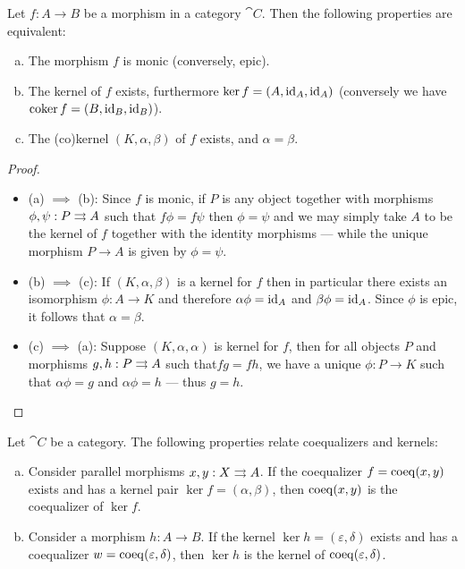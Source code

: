 \begin{proposition}
\label{prop:(co)kernel-properties}
Let \(f: A \to B\) be a morphism in a category \(\cat C\). Then the following
properties are equivalent:
\begin{enumerate}[(a)]\setlength\itemsep{0em}
\item The morphism \(f\) is monic (conversely, epic).
\item The kernel of \(f\) exists, furthermore \(\ker f = (A, \operatorname{id}_A, \operatorname{id}_A)\)
  (conversely we have \(\operatorname{coker} f = (B, \operatorname{id}_B, \operatorname{id}_B)\)).
\item The (co)kernel \((K, \alpha, \beta)\) of \(f\) exists, and
  \(\alpha = \beta\).
\end{enumerate}
\end{proposition}

\begin{proof}
\begin{itemize}\setlength\itemsep{0em}
\item (a) \(\implies\) (b): Since \(f\) is monic, if \(P\) is any object
  together with morphisms \(\phi, \psi: P \rightrightarrows A\) such that
  \(f \phi = f \psi\) then \(\phi = \psi\) and we may simply take \(A\) to be
  the kernel of \(f\) together with the identity morphisms --- while the unique
  morphism \(P \to A\) is given by \(\phi = \psi\).

\item (b) \(\implies\) (c): If \((K, \alpha, \beta)\) is a kernel for \(f\) then
  in particular there exists an isomorphism \(\phi: A \to K\) and therefore
  \(\alpha \phi = \operatorname{id}_A\) and \(\beta \phi = \operatorname{id}_A\). Since \(\phi\) is
  epic, it follows that \(\alpha = \beta\).

\item (c) \(\implies\) (a): Suppose \((K, \alpha, \alpha)\) is kernel for \(f\),
  then for all objects \(P\) and morphisms \(g, h: P \rightrightarrows A\) such that\(f g =
  f h\), we have a unique \(\phi: P \to K\) such that \(\alpha \phi = g\) and
  \(\alpha \phi = h\) --- thus \(g = h\).
\end{itemize}
\end{proof}

\begin{proposition}
\label{prop:coeq-and-ker}
Let \(\cat C\) be a category. The
following properties relate coequalizers and kernels:
\begin{enumerate}[(a)]\setlength\itemsep{0em}
\item Consider parallel morphisms \(x, y: X \rightrightarrows A\). If the coequalizer
  \(f = \operatorname{coeq}(x, y)\) exists and has a kernel pair \(\ker f = (\alpha, \beta)\),
  then \(\operatorname{coeq}(x, y)\) is the coequalizer of \(\ker f\).

\item Consider a morphism \(h: A \to B\). If the kernel
  \(\ker h = (\varepsilon, \delta)\) exists and has a coequalizer
  \(w = \operatorname{coeq}(\varepsilon, \delta)\), then \(\ker h\) is the kernel of
  \(\operatorname{coeq}(\varepsilon, \delta)\).
\end{enumerate}
\end{proposition}

